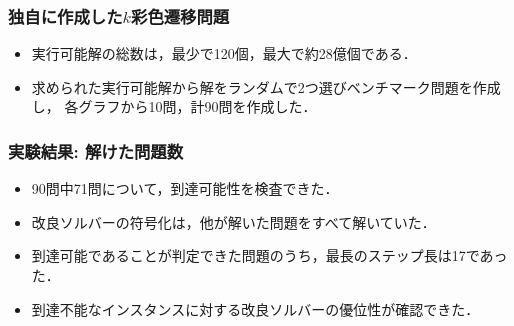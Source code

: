 \documentclass[dvipdfmx,11pt]{beamer}
\begin{document}
\begin{frame}\frametitle{独自に作成した$k$彩色遷移問題}

  \begin{exampleblock}{}
    \centering
    
  \end{exampleblock}

  \begin{itemize}
  \item 実行可能解の総数は，最少で120個，最大で約28億個である．
  \item 求められた実行可能解から解をランダムで2つ選びベンチマーク問題を作成し，
        各グラフから10問，計90問を作成した．
  \end{itemize}

\end{frame}
\begin{frame}\frametitle{実験結果: 解けた問題数}

  \begin{exampleblock}{}
    \centering
    \scalebox{0.9}{}
  \end{exampleblock}

  \begin{itemize}
  \item 90問中71問について，到達可能性を検査できた．
  \item 改良ソルバーの符号化は，他が解いた問題をすべて解いていた．
  \item 到達可能であることが判定できた問題のうち，最長のステップ長は17であった．
  \item 到達不能なインスタンスに対する改良ソルバーの優位性が確認できた．
  \end{itemize}
\end{frame}
\end{document}
